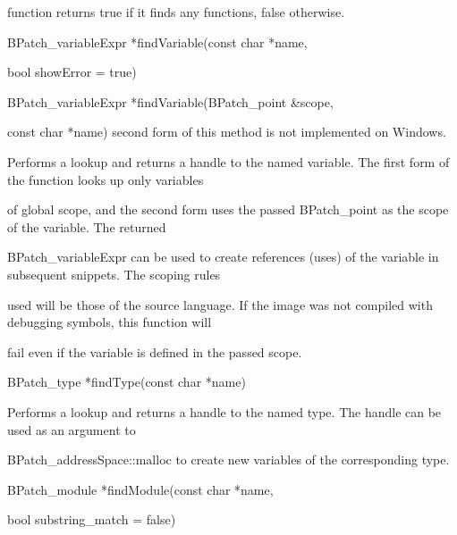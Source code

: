 {{{function returns true if it finds any functions, false otherwise.}





\bigskip



{

BPatch_variableExpr *findVariable(const char *name,



{

bool showError = true)}



{

BPatch_variableExpr *findVariable(BPatch_point &scope,



{

const char *name) second form of this method is not implemented on Windows.}



{

Performs a lookup and returns a handle to the named variable. The first form of the function looks up only variables

of global scope, and the second form uses the passed BPatch_point as the scope of the variable. The returned

BPatch_variableExpr can be used to create references (uses) of the variable in subsequent snippets. The scoping rules

used will be those of the source language. If the image was not compiled with debugging symbols, this function will

fail even if the variable is defined in the passed scope.



{

BPatch_type *findType(const char *name)



{

Performs a lookup and returns a handle to the named type. The handle can be used as an argument to

BPatch_addressSpace::malloc to create new variables of the corresponding type.



{

BPatch_module *findModule(const char *name,}



{

bool substring_match = false)}



}}}}}}}
